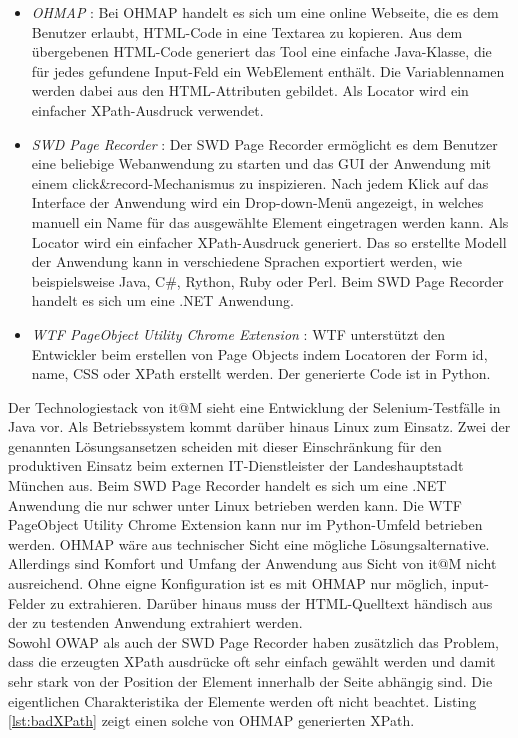 \begin{itemize}
\item \textit{OHMAP} \cite{virtuetech_gmbh_ohmap_2015}: Bei OHMAP handelt es sich um eine online Webseite, die es dem Benutzer erlaubt, HTML-Code in eine Textarea zu kopieren. Aus dem übergebenen HTML-Code generiert das Tool eine einfache Java-Klasse, die für jedes gefundene Input-Feld ein WebElement enthält. Die Variablennamen werden dabei aus den HTML-Attributen gebildet. Als Locator wird ein einfacher XPath-Ausdruck verwendet.
	
\item \textit{SWD Page Recorder} \cite{dmytro_zharii_dzharii/swd-recorder_2015}: Der SWD Page Recorder ermöglicht es dem Benutzer eine beliebige Webanwendung zu starten und das GUI der Anwendung mit einem \grq click\&record\grq-Mechanismus zu inspizieren.
Nach jedem Klick auf das Interface der Anwendung wird ein Drop-down-Menü angezeigt, in welches manuell ein Name für das ausgewählte Element eingetragen werden kann. Als Locator wird ein einfacher XPath-Ausdruck generiert.
Das so erstellte Modell der Anwendung kann in verschiedene Sprachen exportiert werden, wie beispielsweise Java, C\#, Rython, Ruby oder Perl. Beim SWD Page Recorder handelt es sich um eine .NET Anwendung.

\item\textit{ WTF PageObject Utility Chrome Extension} \cite{daniel_wiredrive/wtframework_2015}: WTF unterstützt den Entwickler beim erstellen von Page Objects indem Locatoren der Form id, name, CSS oder XPath erstellt werden. Der generierte Code ist in Python.
	
\end{itemize}

Der Technologiestack von it@M sieht eine Entwicklung der Selenium-Testfälle in Java vor. Als Betriebssystem kommt darüber hinaus Linux zum Einsatz.
Zwei der genannten Lösungsansetzen scheiden mit dieser Einschränkung für den produktiven Einsatz beim externen IT-Dienstleister der Landeshauptstadt München aus. Beim SWD Page Recorder handelt es sich um eine .NET Anwendung die nur schwer unter Linux betrieben werden kann. Die WTF PageObject Utility Chrome Extension kann nur im Python-Umfeld betrieben werden. OHMAP wäre aus technischer Sicht eine mögliche Lösungsalternative. Allerdings sind Komfort und Umfang der Anwendung aus Sicht von it@M nicht ausreichend. Ohne eigne Konfiguration ist es mit OHMAP nur möglich, input-Felder zu extrahieren.
Darüber hinaus muss der HTML-Quelltext händisch aus der zu testenden Anwendung extrahiert werden. \\
Sowohl OWAP als auch der SWD Page Recorder haben zusätzlich das Problem, dass die erzeugten XPath ausdrücke oft sehr einfach gewählt werden und damit sehr stark von der Position der Element innerhalb der Seite abhängig sind. Die eigentlichen Charakteristika der Elemente werden oft nicht beachtet. Listing \ref{lst:badXPath}
zeigt einen solche von OHMAP generierten XPath.

